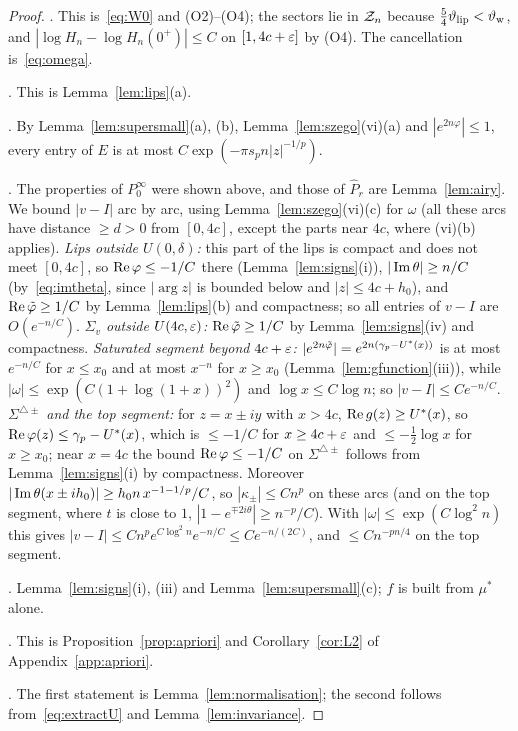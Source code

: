 \begin{proof}
. This is~\eqref{eq:W0} and (O2)--(O4); the sectors lie in $\mathcal{Z}_n$ because $\frac54\vartheta_{\mathrm{lip}}<\vartheta_{\mathrm{w}}$, and
$|\log H_n-\log H_n(0^+)|\le C$ on $[1,4c+\varepsilon]$ by (O4). The cancellation is~\eqref{eq:omega}.

. This is Lemma~\ref{lem:lips}(a).

. By Lemma~\ref{lem:supersmall}(a), (b), Lemma~\ref{lem:szego}(vi)(a) and $|e^{2n\varphi}|\le1$, every entry of $E$ is at most
$C\exp(-\pi s_pn|z|^{-1/p})$.

. The properties of $P^\infty_0$ were shown above, and those of $\hat P_r$ are Lemma~\ref{lem:airy}. We bound $|v-I|$
arc by arc, using Lemma~\ref{lem:szego}(vi)(c) for $\omega$ (all these arcs have distance $\ge d>0$ from $[0,4c]$, except the
parts near $4c$, where (vi)(b) applies).
\emph{Lips outside $U(0,\delta)$:} this part of the lips is compact and does not meet $[0,4c]$, so $\operatorname{Re}\varphi\le-1/C$ there
(Lemma~\ref{lem:signs}(i)), $|\operatorname{Im}\theta|\ge n/C$ (by~\eqref{eq:imtheta}, since $|\arg z|$ is bounded below and
$|z|\le4c+h_0$), and $\operatorname{Re}\tilde\varphi\ge1/C$ by Lemma~\ref{lem:lips}(b) and compactness; so all entries of $v-I$ are
$O(e^{-n/C})$.
\emph{$\Sigma_v$ outside $U(4c,\varepsilon)$:} $\operatorname{Re}\tilde\varphi\ge1/C$ by Lemma~\ref{lem:signs}(iv) and compactness.
\emph{Saturated segment beyond $4c+\varepsilon$:} $|e^{2n\tilde\varphi}|=e^{2n(\gamma_p-U^*(x))}$ is at most $e^{-n/C}$ for $x\le x_0$ and at
most $x^{-n}$ for $x\ge x_0$ (Lemma~\ref{lem:gfunction}(iii)), while $|\omega|\le\exp(C(1+\log(1+x))^2)$ and $\log x\le
C\log n$; so $|v-I|\le Ce^{-n/C}$.
\emph{$\Sigma^{\triangle\pm}$ and the top segment:} for $z=x\pm iy$ with $x>4c$, $\operatorname{Re} g(z)\ge U^*(x)$, so
$\operatorname{Re}\varphi(z)\le\gamma_p-U^*(x)$, which is $\le-1/C$ for $x\ge4c+\varepsilon$ and $\le-\frac12\log x$ for $x\ge x_0$; near $x=4c$ the
bound $\operatorname{Re}\varphi\le-1/C$ on $\Sigma^{\triangle\pm}$ follows from Lemma~\ref{lem:signs}(i) by compactness. Moreover
$|\operatorname{Im}\theta(x\pm ih_0)|\ge h_0n\,x^{-1-1/p}/C$, so $|\kappa_\pm|\le Cn^p$ on these arcs (and on the top segment, where $t$ is
close to $1$, $|1-e^{\mp2i\theta}|\ge n^{-p}/C$). With $|\omega|\le\exp(C\log^2n)$ this gives
$|v-I|\le Cn^pe^{C\log^2n}e^{-n/C}\le Ce^{-n/(2C)}$, and $\le Cn^{-pn/4}$ on the top segment.

. Lemma~\ref{lem:signs}(i), (iii) and Lemma~\ref{lem:supersmall}(c); $f$ is built from $\mu^*$ alone.

. This is Proposition~\ref{prop:apriori} and Corollary~\ref{cor:L2} of Appendix~\ref{app:apriori}.

. The first statement is Lemma~\ref{lem:normalisation}; the second follows from~\eqref{eq:extractU} and
Lemma~\ref{lem:invariance}.
\end{proof}

